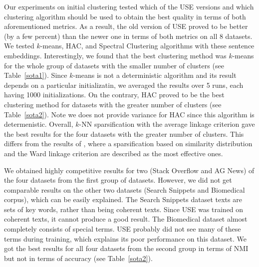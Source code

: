 \documentclass[11pt,a4paper]{article}
\begin{document}
Our experiments on initial clustering tested which of the USE versions and which clustering algorithm should be used to obtain the best quality in terms of both aforementioned metrics. As a result, the old version of USE \cite{DBLP:journals/corr/abs-1803-11175} proved to be better (by a few percent) than the newer one \cite{DBLP:journals/corr/abs-1907-04307} in terms of both metrics on all 8 datasets. We tested $k$-means, HAC, and Spectral Clustering algorithms with these sentence embeddings. Interestingly, we found that the best clustering method was $k$-means for the whole group of datasets with the smaller number of clusters (see Table~\ref{sota1}). Since $k$-means is not a deterministic algorithm and its result depends on a particular initializatin, we averaged the results over 5 runs, each having 1000 initializations. On the contrary, HAC proved to be the best clustering method for datasets with the greater number of clusters (see Table~\ref{sota2}). Note we does not provide variance for HAC since this algorithm is determenistic.  Overall, $k$-NN sparsification  with the average linkage criterion gave the best results for the four datasets with the greater number of clusters. This differs from the results of \cite{rakib2020enhancement}, where a sparsification based on similarity distribution and the Ward linkage criterion are described as the most effective ones.

We obtained highly competitive results for two (Stack Overflow and AG News) of the four datasets from the first group of datasets. However, we did not get comparable results on the other two datasets (Search Snippets and Biomedical corpus), which can be easily explained. The Search Snippets dataset texts are sets of key words, rather than being coherent texts. Since USE was trained on coherent texts, it cannot produce a good result. The Biomedical dataset almost completely consists of special terms. USE probably did not see many of these terms during training, which explains its poor performance on this dataset. We got the best results for all four datasets from the second group in terms of NMI but not in terms of accuracy (see Table~\ref{sota2}).
\end{document}
